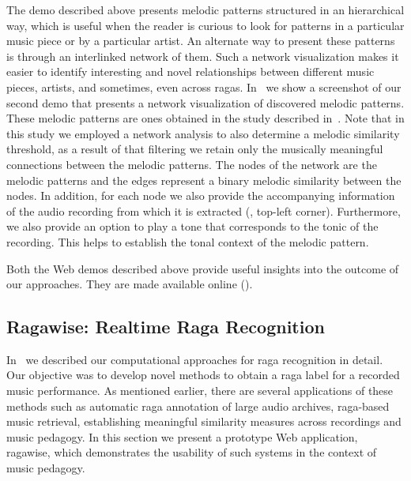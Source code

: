 The demo described above presents melodic patterns structured in an hierarchical way, which is useful when the reader is curious to look for patterns in a particular music piece or by a particular artist. An alternate way to present these patterns is through an interlinked network of them. Such a network visualization makes it easier to identify interesting and novel relationships between different music pieces, artists, and sometimes, even across \glspl{raga}. In~ we show a screenshot of our second demo that presents a network visualization of discovered melodic patterns. These melodic patterns are ones obtained in the study described in~\secref{}. Note that in this study we employed a network analysis to also determine a melodic similarity threshold, as a result of that filtering we retain only the musically meaningful connections between the melodic patterns. The nodes of the network are the melodic patterns and the edges represent a binary melodic similarity between the nodes.  In addition, for each node we also provide the accompanying information of the audio recording from which it is extracted (, top-left corner). Furthermore, we also provide an option to play a tone that corresponds to the tonic of the recording. This helps to establish the tonal context of the melodic pattern.

Both the Web demos described above provide useful insights into the outcome of our approaches. They are made available online (). 


\subsection*{Ragawise: Realtime Raga Recognition}
\label{sec:ragawise}

In~\chapref{} we described our computational approaches for \gls{raga} recognition in detail. Our objective was to develop novel methods to obtain a \gls{raga} label for a recorded music performance. As mentioned earlier, there are several applications of these methods such as automatic \gls{raga} annotation of large audio archives, \gls{raga}-based music retrieval, establishing meaningful similarity measures across recordings and music pedagogy. In this section we present a prototype Web application, \gls{ragawise}, which demonstrates the usability of such systems in the context of music pedagogy. 

